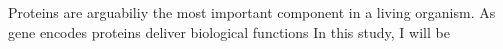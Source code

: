 Proteins are arguabiliy the most important component in a living organism. As gene encodes  proteins deliver biological functions   In this study, I will be 